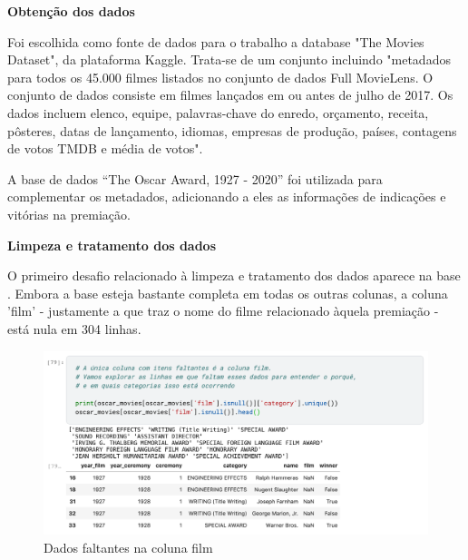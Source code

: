             \textbf{Obtenção dos dados}\par

            Foi escolhida como fonte de dados para o trabalho a database "The Movies Dataset", da plataforma Kaggle. Trata-se de um conjunto incluindo "metadados para todos os 45.000 filmes listados no conjunto de dados Full MovieLens. O conjunto de dados consiste em filmes lançados em ou antes de julho de 2017. Os dados incluem elenco, equipe, palavras-chave do enredo, orçamento, receita, pôsteres, datas de lançamento, idiomas, empresas de produção, países, contagens de votos TMDB e média de votos".\cite{kaggle2017}\par
            
            A base de dados ``The Oscar Award, 1927 - 2020'' foi utilizada para complementar os metadados, adicionando a eles as informações de indicações e vitórias na premiação.\cite{kaggle2019}\newline

            \textbf{Limpeza e tratamento dos dados}\par
            
            O primeiro desafio relacionado à limpeza e tratamento dos dados aparece na base . Embora a base esteja bastante completa em todas os outras colunas, a coluna 'film' - justamente a que traz o nome do filme relacionado àquela premiação - está nula em 304 linhas.
            
            \begin{figure}[htb]
            	\caption{\label{faltantes_film}Dados faltantes na coluna film}
            	\begin{center}
            		\includegraphics[scale=0.5]{faltantes_film.png}
            	\end{center}
            \end{figure}
            
